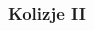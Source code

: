 \documentclass[aspectratio=169]{beamer}
\begin{document}
\begin{frame}%
	\frametitle{Kolizje II}
	\begin{columns}
		\begin{column}{0.5\textwidth}
	   	 	\begin{figure}
	   		 \centering
	    		\end{figure}
		\end{column}
		\begin{column}{0.5\textwidth}
	   	 	\begin{figure}
	   		 \centering
	    		\end{figure}
		\end{column}
	\end{columns}
\end{frame}
\end{document}

